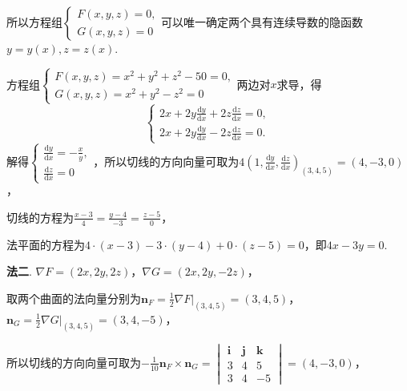 \documentclass[../main.tex]{subfiles}
\begin{document}
\begin{enumerate}
          所以方程组$\begin{cases}
                  F(x,y,z)=0, \\
                  G(x,y,z)=0
              \end{cases}$可以唯一确定两个具有连续导数的隐函数$y=y(x),z=z(x)$.

          方程组$\begin{cases}
                  F(x,y,z) = x^{2}+y^{2}+z^{2}-50=0, \\
                  G(x,y,z)=x^{2}+y^{2}-z^{2}=0
              \end{cases}$两边对$x$求导，得
          \[
              \begin{cases}
                  2x+2y\frac{\mathrm{d}y}{\mathrm{d}x}+2z\frac{\mathrm{d}z}{\mathrm{d}x}= 0, \\[6pt]
                  2x+2y\frac{\mathrm{d}y}{\mathrm{d}x}-2z\frac{\mathrm{d}z}{\mathrm{d}x}= 0.
              \end{cases}
          \]
          解得$\begin{cases}
                  \frac{\mathrm{d}y}{\mathrm{d}x} = -\frac{x}{y}, \\[6pt]
                  \frac{\mathrm{d}z}{\mathrm{d}x} = 0
              \end{cases}$，所以切线的方向向量可取为$4\left(1,\frac{\mathrm{d}y}{\mathrm{d}x}
              ,\frac{\mathrm{d}z}{\mathrm{d}x}\right)_{(3,4,5)}=\left(4,-3,0\right)$，

          切线的方程为$\frac{x-3}{4}=\frac{y-4}{-3}=\frac{z-5}{0}$，

          法平面的方程为$4\cdot(x-3)-3\cdot(y-4)+0\cdot(z-5)=0$，即$4x-3y=0$.

          \textbf{法二}. $\nabla F = (2x,2y,2z)$，$\nabla G = (2x,2y,-2z)$，

          取两个曲面的法向量分别为$\boldsymbol{n}_{F}= \frac{1}{2}\nabla F|_{(3,4,5)}
              = (3,4,5)$，$\boldsymbol{n}_{G}= \frac{1}{2}\nabla G|_{(3,4,5)}= (3,4,-5)$，

          所以切线的方向向量可取为$-\frac{1}{10}\boldsymbol{n}_{F}\times \boldsymbol{n}
              _{G}=
              \begin{vmatrix}
                  \boldsymbol{i} & \boldsymbol{j} & \boldsymbol{k} \\
                  3              & 4              & 5              \\
                  3              & 4              & -5
              \end{vmatrix}
              = (4,-3,0)$，


\end{enumerate}
\end{document}
